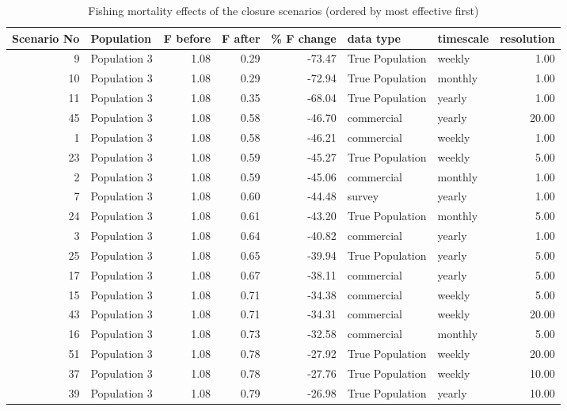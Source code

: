 \begin{longtable}{rlrrrllr}
\caption{Fishing mortality effects of the
	     closure scenarios (ordered by most effective first)} \\ 
  \hline
Scenario No & Population & F before & F after & \% F change & data type & timescale & resolution \\ 
  \hline
  9 & Population 3 & 1.08 & 0.29 & -73.47 & True Population & weekly & 1.00 \\ 
   10 & Population 3 & 1.08 & 0.29 & -72.94 & True Population & monthly & 1.00 \\ 
   11 & Population 3 & 1.08 & 0.35 & -68.04 & True Population & yearly & 1.00 \\ 
   45 & Population 3 & 1.08 & 0.58 & -46.70 & commercial & yearly & 20.00 \\ 
    1 & Population 3 & 1.08 & 0.58 & -46.21 & commercial & weekly & 1.00 \\ 
   23 & Population 3 & 1.08 & 0.59 & -45.27 & True Population & weekly & 5.00 \\ 
    2 & Population 3 & 1.08 & 0.59 & -45.06 & commercial & monthly & 1.00 \\ 
    7 & Population 3 & 1.08 & 0.60 & -44.48 & survey & yearly & 1.00 \\ 
   24 & Population 3 & 1.08 & 0.61 & -43.20 & True Population & monthly & 5.00 \\ 
    3 & Population 3 & 1.08 & 0.64 & -40.82 & commercial & yearly & 1.00 \\ 
   25 & Population 3 & 1.08 & 0.65 & -39.94 & True Population & yearly & 5.00 \\ 
   17 & Population 3 & 1.08 & 0.67 & -38.11 & commercial & yearly & 5.00 \\ 
   15 & Population 3 & 1.08 & 0.71 & -34.38 & commercial & weekly & 5.00 \\ 
   43 & Population 3 & 1.08 & 0.71 & -34.31 & commercial & weekly & 20.00 \\ 
   16 & Population 3 & 1.08 & 0.73 & -32.58 & commercial & monthly & 5.00 \\ 
   51 & Population 3 & 1.08 & 0.78 & -27.92 & True Population & weekly & 20.00 \\ 
   37 & Population 3 & 1.08 & 0.78 & -27.76 & True Population & weekly & 10.00 \\ 
   39 & Population 3 & 1.08 & 0.79 & -26.98 & True Population & yearly & 10.00 \\ 

\end{longtable}
